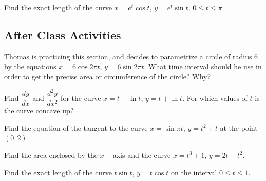 \documentclass[notes]{subfiles}
\begin{document}
		\begin{ex}
			Find the exact length of the curve $x = e^t\cos t$, $y = e^t\sin t$, $0\leq t\leq \pi$
		\end{ex}
			\newpage
			
	\subsection*{After Class Activities}
		\begin{ex}
			Thomas is practicing this section, and decides to parametrize a circle of radius 6 by the equations $x = 6\cos 2\pi t$, $y = 6\sin 2\pi t$.  What time interval should he use in order to get the precise area or circumference of the circle?  Why?
		\end{ex}	
			
		\begin{ex}
			Find $\dfrac{dy}{dx}$ and $\dfrac{d^2y}{dx^2}$ for the curve $x = t - \ln t$, $ y=  t + \ln t$.  For which values of $t$ is the curve concave up?
		\end{ex}
			
		\begin{ex}
			Find the equation of the tangent to the curve $x = \sin \pi t$, $y = t^2 + t$ at the point $(0,2)$.
		\end{ex}
			\newpage
			
		\begin{ex}
			Find the area enclosed by the $x-$axis and the curve $x = t^3 + 1$, $y = 2t-t^2$.
		\end{ex}
			
		\begin{ex}
			Find the exact length of the curve $t\sin t$, $y =t\cos t$ on the interval $0\leq t\leq 1$.
		\end{ex}
\clearpage
\end{document}
